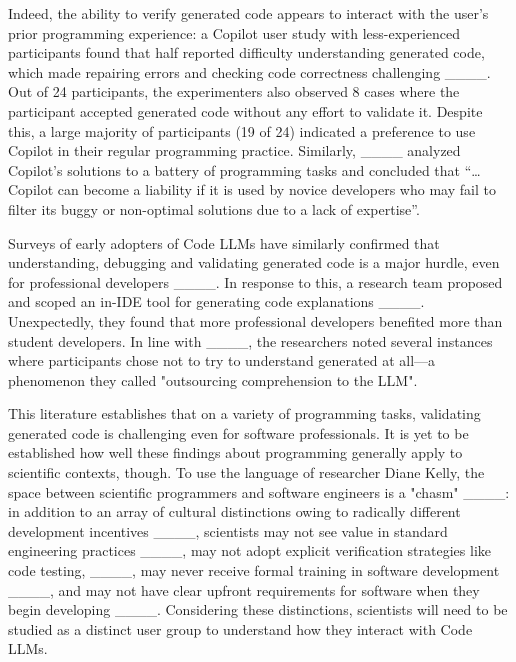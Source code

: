  
Indeed, the ability to verify generated code appears to interact with the user's prior programming experience: a Copilot user study with less-experienced participants found that half reported difficulty understanding generated code, which made repairing errors and checking code correctness challenging ____. Out of 24 participants, the experimenters also observed 8 cases where the participant accepted generated code without any effort to validate it. Despite this, a large majority of participants (19 of 24) indicated a preference to use Copilot in their regular programming practice. Similarly, ____ analyzed Copilot’s solutions to a battery of programming tasks and concluded that “…Copilot can become a liability if it is used by novice developers who may fail to filter its buggy or non-optimal solutions due to a lack of expertise”.  

Surveys of early adopters of Code LLMs have similarly confirmed that understanding, debugging and validating generated code is a major hurdle, even for professional developers ____. In response to this, a research team proposed and scoped an in-IDE tool for generating code explanations ____. Unexpectedly, they found that more professional developers benefited more than student developers. In line with ____, the researchers noted several instances where participants chose not to try to understand generated  at all---a phenomenon they called "outsourcing comprehension to the LLM". 

This literature establishes that on a variety of programming tasks, validating generated code is challenging even for software professionals. It is yet to be established how well these findings about programming generally apply to scientific contexts, though. To use the language of researcher Diane Kelly, the space between scientific programmers and software engineers is a "chasm" ____: in addition to an array of cultural distinctions owing to radically different development incentives ____, scientists may not see value in standard engineering practices ____, may not adopt explicit verification strategies like code testing, ____, may never receive formal training in software development ____, and may not have clear upfront requirements for software when they begin developing ____. Considering these distinctions, scientists will need to be studied as a distinct user group to understand how they interact with Code LLMs.  



